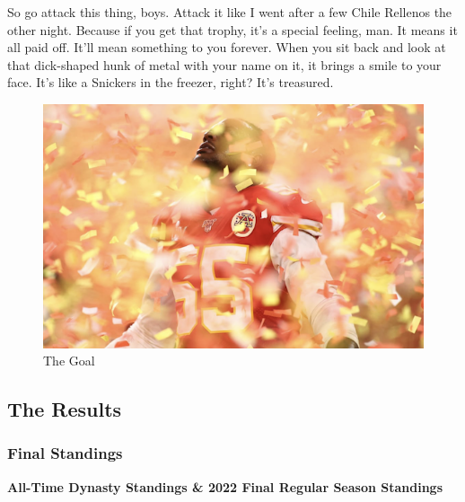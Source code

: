 \documentclass[
]{article}
\begin{document}
So go attack this thing, boys. Attack it like I went after a few Chile
Rellenos the other night. Because if you get that trophy, it's a special
feeling, man. It means it all paid off. It'll mean something to you
forever. When you sit back and look at that dick-shaped hunk of metal
with your name on it, it brings a smile to your face. It's like a
Snickers in the freezer, right? It's treasured.

\begin{figure}
\centering
\includegraphics{img/confetti.png}
\caption{The Goal}
\end{figure}

\newpage

\hypertarget{the-results}{%
\subsection{The Results}\label{the-results}}

\hypertarget{final-standings}{%
\subsubsection{Final Standings}\label{final-standings}}

\textbf{All-Time Dynasty Standings \& 2022 Final Regular Season
Standings}
\end{document}
